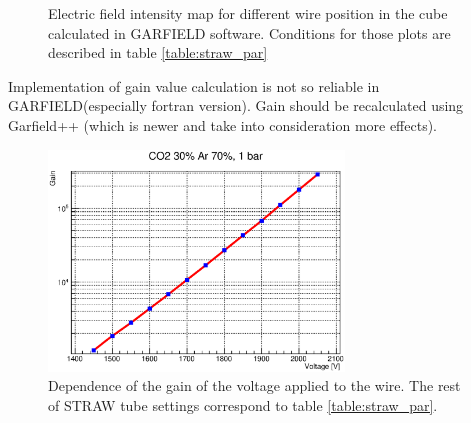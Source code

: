\documentclass[12pt,a4paper]{article}
\begin{document}
	\begin{figure}[!h] 
		\centering
		\qquad
		\caption{Electric field intensity map for different wire position in the cube calculated in GARFIELD software. Conditions for those plots are described in table \ref{table:straw_par} }
	\end{figure}
	
	Implementation of gain value calculation is not so reliable in GARFIELD(especially fortran version). Gain should be recalculated using Garfield++ (which is newer and take into consideration more effects).
	
	\begin{figure}[h!]
	\centering
	\includegraphics[width=0.7\textwidth]{gain_1450_2050V}	
	\caption{Dependence of the gain of the voltage applied to the wire. The rest of STRAW tube settings correspond to table \ref{table:straw_par}. }
	\label{fig:gainVoltage}	
	\end{figure}
\end{document}
